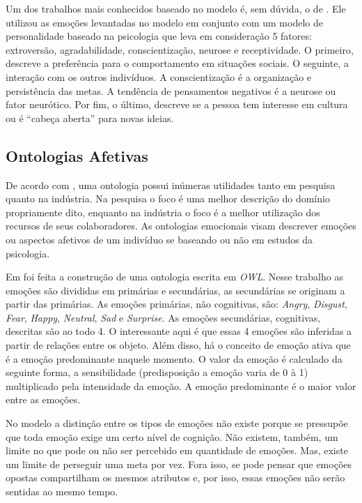 Um dos trabalhos mais conhecidos baseado no modelo \occ é, sem dúvida, o de
\citet{kshirsagar2002multilayer}. Ele utilizou
as emoções levantadas no modelo em conjunto com um modelo de personalidade
baseado na psicologia que leva em consideração 5 fatores: extroversão,
agradabilidade, conscientização, neurose e receptividade. O primeiro, descreve
a preferência para o comportamento em situações sociais. O seguinte, a
interação com os outros indivíduos. A conscientização é a organização e
persistência das metas. A tendência de pensamentos negativos é a neurose ou
fator neurótico. Por fim, o último, descreve se a pessoa tem interesse em
cultura ou é ``cabeça aberta'' para novas ideias.

\subsection{Ontologias Afetivas}

De acordo com \citet{Gutierrez:2007:OVH:1229160.1229164}, uma
ontologia possui inúmeras utilidades tanto em pesquisa quanto na
indústria. Na pesquisa o foco é uma melhor descrição do domínio propriamente
dito, enquanto na indústria o foco é a melhor utilização dos recursos de seus
colaboradores. As ontologias emocionais visam descrever emoções ou aspectos
afetivos de um indivíduo se baseando ou não em estudos da psicologia.

Em \citet{benta2007ontology} foi feita a construção de uma ontologia escrita em
\emph{OWL}. Nesse trabalho as emoções são divididas em primárias e secundárias, as
secundárias se originam a partir das primárias. As emoções primárias,
não cognitivas, são: \emph{Angry}, \emph{Disgust}, \emph{Fear},
\emph{Happy}, \emph{Neutral}, \emph{Sad} e \emph{Surprise}. As emoções
secundárias, cognitivas, descritas são ao todo 4. O interessante aqui é que
essas 4 emoções são inferidas a partir de relações entre os objeto. Além disso,
há o conceito de emoção ativa que é a emoção predominante naquele momento. O
valor da emoção é calculado da seguinte forma, a sensibilidade (predisposição
a emoção varia de 0 à 1) multiplicado pela intensidade da emoção. A emoção
predominante é o maior valor entre as emoções.

No modelo \occ a distinção entre os tipos de
emoções não existe porque se pressupõe que toda emoção exige um certo nível de
cognição. Não existem, também, um limite no que pode ou não ser percebido em
quantidade de emoções. Mas, existe um limite de perseguir uma meta por vez.
Fora isso, se pode pensar que emoções opostas compartilham os mesmos atributos
e, por isso, essas emoções não serão sentidas ao mesmo tempo.

